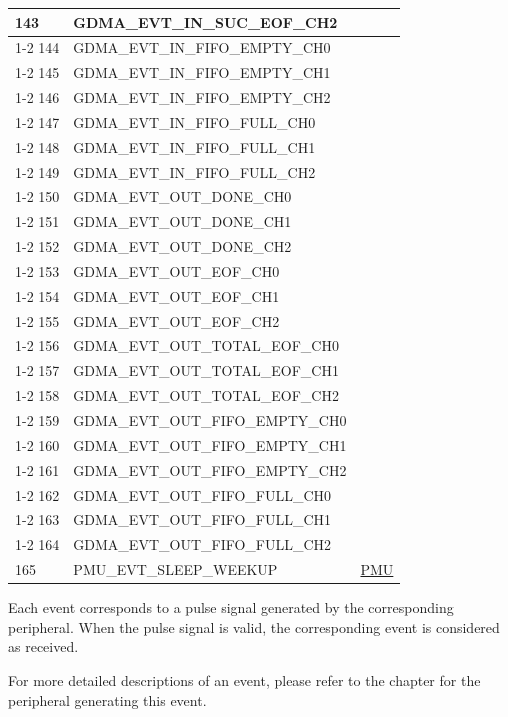 \documentclass[main\_\_EN.tex]{subfiles}
\begin{document}
\begin{longtable}{ | l | l | l | }
143 & GDMA\_EVT\_IN\_SUC\_EOF\_CH2     & \\ \cline{1-2}
144 & GDMA\_EVT\_IN\_FIFO\_EMPTY\_CH0  & \\ \cline{1-2}
145 & GDMA\_EVT\_IN\_FIFO\_EMPTY\_CH1  & \\ \cline{1-2}
146 & GDMA\_EVT\_IN\_FIFO\_EMPTY\_CH2  & \\ \cline{1-2}
147 & GDMA\_EVT\_IN\_FIFO\_FULL\_CH0   & \\ \cline{1-2}
148 & GDMA\_EVT\_IN\_FIFO\_FULL\_CH1   & \\ \cline{1-2}
149 & GDMA\_EVT\_IN\_FIFO\_FULL\_CH2   & \\ \cline{1-2}
150 & GDMA\_EVT\_OUT\_DONE\_CH0 & \\ \cline{1-2}
151 & GDMA\_EVT\_OUT\_DONE\_CH1 & \\ \cline{1-2}
152 & GDMA\_EVT\_OUT\_DONE\_CH2 & \\ \cline{1-2}
153 & GDMA\_EVT\_OUT\_EOF\_CH0  & \\ \cline{1-2}
154 & GDMA\_EVT\_OUT\_EOF\_CH1  & \\ \cline{1-2}
155 & GDMA\_EVT\_OUT\_EOF\_CH2  & \\ \cline{1-2}
156 & GDMA\_EVT\_OUT\_TOTAL\_EOF\_CH0  & \\ \cline{1-2}
157 & GDMA\_EVT\_OUT\_TOTAL\_EOF\_CH1  & \\ \cline{1-2}
158 & GDMA\_EVT\_OUT\_TOTAL\_EOF\_CH2  & \\ \cline{1-2}
159 & GDMA\_EVT\_OUT\_FIFO\_EMPTY\_CH0 & \\ \cline{1-2}
160 & GDMA\_EVT\_OUT\_FIFO\_EMPTY\_CH1 & \\ \cline{1-2}
161 & GDMA\_EVT\_OUT\_FIFO\_EMPTY\_CH2 & \\ \cline{1-2}
162 & GDMA\_EVT\_OUT\_FIFO\_FULL\_CH0  & \\ \cline{1-2}
163 & GDMA\_EVT\_OUT\_FIFO\_FULL\_CH1  & \\ \cline{1-2}
164 & GDMA\_EVT\_OUT\_FIFO\_FULL\_CH2  & \\ \hline
165 & PMU\_EVT\_SLEEP\_WEEKUP   & \hyperref[mod:lowpowm]{PMU} \\ \hline
\end{longtable}

Each event corresponds to a pulse signal generated by the corresponding peripheral. When the pulse signal is valid, the corresponding event is considered as received.

For more detailed descriptions of an event, please refer to the chapter for the peripheral generating this event.
\end{document}
